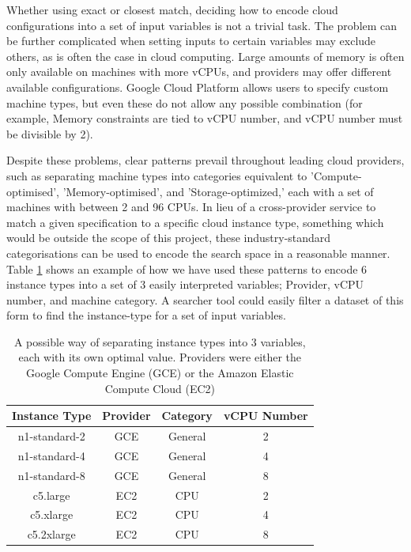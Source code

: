 \documentclass{article}
\begin{document}
Whether using exact or closest match, deciding how to encode cloud configurations into a set of input variables is not a trivial task. The problem can be further complicated when setting inputs to certain variables may exclude others, as is often the case in cloud computing. Large amounts of memory is often only available on machines with more vCPUs, and providers may offer different available configurations. Google Cloud Platform allows users to specify custom machine types, but even these do not allow any possible combination (for example, Memory constraints are tied to vCPU number, and vCPU number must be divisible by 2).

Despite these problems, clear patterns prevail throughout leading cloud providers, such as separating machine types into categories equivalent to 'Compute-optimised', 'Memory-optimised', and 'Storage-optimized,' each with a set of machines with between 2 and 96 CPUs. In lieu of a cross-provider service to match a given specification to a specific cloud instance type, something which would be outside the scope of this project, these industry-standard categorisations can be used to encode the search space in a reasonable manner. Table \ref{tab:config-encode} shows an example of how we have used these patterns to encode 6 instance types into a set of 3 easily interpreted variables; Provider, vCPU number, and machine category. A searcher tool could easily filter a dataset of this form to find the instance-type for a set of input variables.

\begin{table}[!t]
\centering
\begin{tabular}{ |c||c|c|c|  }
 \hline
 Instance Type & Provider & Category & vCPU Number \\
 \hline
 n1-standard-2    & GCE  & General & 2\\
 n1-standard-4    & GCE  & General & 4\\
 n1-standard-8    & GCE  & General & 8\\
 c5.large         & EC2  & CPU & 2\\
 c5.xlarge    & EC2  & CPU & 4\\
 c5.2xlarge    & EC2  & CPU & 8\\
 \hline
\end{tabular}
\caption{A possible way of separating instance types into 3 variables, each with its own optimal value. Providers were either the Google Compute Engine (GCE) or the Amazon Elastic Compute Cloud (EC2)}
\label{tab:config-encode}
\end{table}
\end{document}
